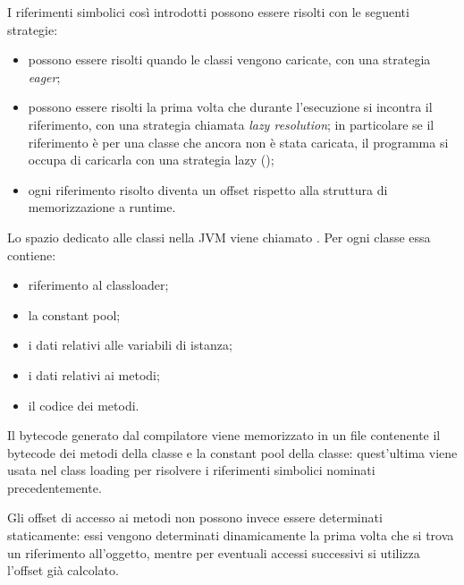 I riferimenti simbolici così introdotti possono essere risolti con le seguenti strategie:
\begin{itemize}
    \item possono essere risolti quando le classi vengono caricate, con una strategia \emph{eager};
    \item possono essere risolti la prima volta che durante l'esecuzione si incontra il riferimento, con una strategia chiamata \emph{lazy resolution}; in particolare se il riferimento è per una classe che ancora non è stata caricata, il programma si occupa di caricarla con una strategia lazy ();
    \item ogni riferimento risolto diventa un offset rispetto alla struttura di memorizzazione a runtime.
\end{itemize}

Lo spazio dedicato alle classi nella JVM viene chiamato . Per ogni classe essa contiene:
\begin{itemize}
    \item riferimento al classloader;
    \item la constant pool;
    \item i dati relativi alle variabili di istanza;
    \item i dati relativi ai metodi;
    \item il codice dei metodi.
\end{itemize}
Il bytecode generato dal compilatore  viene memorizzato in un file  contenente il bytecode dei metodi della classe e la constant pool della classe: quest'ultima viene usata nel class loading per risolvere i riferimenti simbolici nominati precedentemente.

Gli offset di accesso ai metodi non possono invece essere determinati staticamente: essi vengono determinati dinamicamente la prima volta che si trova un riferimento all'oggetto, mentre per eventuali accessi successivi si utilizza l'offset già calcolato. 